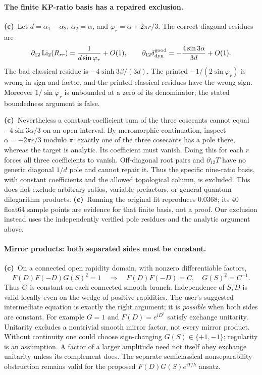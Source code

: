 \documentclass[11pt,a4paper]{article}
\newcommand{\Lc}{\textbf{(c)}\ }
\begin{document}
\paragraph{The finite KP-ratio basis has a repaired exclusion.}
\Lc Let $d=\alpha_1-\alpha_2$, $\alpha_2=\alpha$, and
$\varphi_r=\alpha+2\pi r/3$. The correct diagonal residues are
\begin{equation}
 \partial_{12}\operatorname{Li}_2(R_{rr})
 =\frac{1}{d\sin\varphi_r}+O(1),\qquad
 \partial_{12}\delta_{\rm dyn}^{\rm good}
 =-\frac{4\sin3\alpha}{3d}+O(1).
 \label{eq:residue}
\end{equation}
The bad classical residue is $-4\sinh3\beta/(3d)$.
The printed $-1/(2\sin\varphi_r)$ is wrong in sign and factor, and the
printed classical residues have the wrong sign. Moreover $1/\sin\varphi_r$
is unbounded at a zero of its denominator; the stated boundedness argument
is false.

\Lc Nevertheless a constant-coefficient sum of the three cosecants cannot
equal $-4\sin3\alpha/3$ on an open interval. By meromorphic continuation,
inspect $\alpha=-2\pi r/3$ modulo $\pi$: exactly one of the three cosecants
has a pole there, whereas the target is analytic. Its coefficient must vanish.
Doing this for each $r$ forces all three coefficients to vanish. Off-diagonal
root pairs and $\partial_{12}T$ have no generic diagonal $1/d$ pole and cannot
repair it. Thus the specific nine-ratio basis, with constant coefficients
and the allowed topological column, is excluded. This does not exclude
arbitrary ratios, variable prefactors, or general quantum-dilogarithm products.
\Lc Running the original fit reproduces 0.0368; its 40 float64 sample points
are evidence for that finite basis, not a proof. Our exclusion instead uses
the independently verified pole residues and the analytic argument above.

\paragraph{Mirror products: both separated sides must be constant.}
\Lc On a connected open rapidity domain, with nonzero differentiable factors,
\begin{equation}
 F(D)F(-D)G(S)^2=1
 \quad\Longrightarrow\quad F(D)F(-D)=C,\quad G(S)^2=C^{-1}.
\end{equation}
Thus $G$ is constant on each connected smooth branch. Independence of $S,D$
is valid locally even on the wedge of positive rapidities. The user's
suggested intermediate equation is exactly the right argument; it is
\emph{possible} when both sides are constant. For example $G=1$ and
$F(D)=e^{iD^3}$ satisfy exchange unitarity. Unitarity excludes a nontrivial
smooth mirror factor, not every mirror product. Without continuity one could
choose sign-changing $G(S)\in\{+1,-1\}$; regularity is an assumption.
A factor of a larger amplitude need not itself obey exchange unitarity
unless its complement does. The separate semiclassical nonseparability
obstruction remains valid for the proposed $F(D)G(S)e^{iT/\hbar}$ ansatz.
\end{document}
